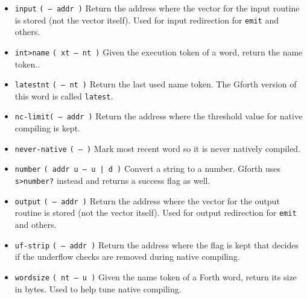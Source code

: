 \begin{itemize}
        \item \texttt{input} \texttt{( -- addr )} 
                Return the address where the vector for the input routine is
                stored (not the vector itself). Used for input redirection for 
                \texttt{emit} and others. 

        \item \texttt{int>name} \texttt{( xt -- nt )} 
                Given the execution token of a
                word, return the name token.. 
                
        \item \texttt{latestnt} \texttt{( -- nt )} 
                Return the last used name token. The Gforth
                version of this word is called
                \texttt{latest}.

        \item \texttt{nc-limit}\texttt{( -- addr )} 
                Return the address where the threshold value for native
                compiling is kept.  

        \item \texttt{never-native} \texttt{( -- )} 
                Mark most recent word so it is never natively compiled.

        \item \texttt{number} 
                \texttt{( addr u -- u | d )} Convert a string to a number.
                Gforth uses
                \texttt{s>number?} instead
                and returns a success flag as well. 

        \item \texttt{output} \texttt{( -- addr )} 
                Return the address where the vector for the output routine is
                stored (not the vector itself). Used for output redirection for 
                \texttt{emit} and others. 

        \item \texttt{uf-strip} \texttt{( -- addr )} 
                Return the address where the flag is kept that decides if
                the underflow checks are removed during native
                compiling.

        \item \texttt{wordsize}
                \texttt{( nt -- u )} Given the name token  of
                a Forth word, return its size in bytes. Used to help tune 
                native compiling.

\end{itemize}


